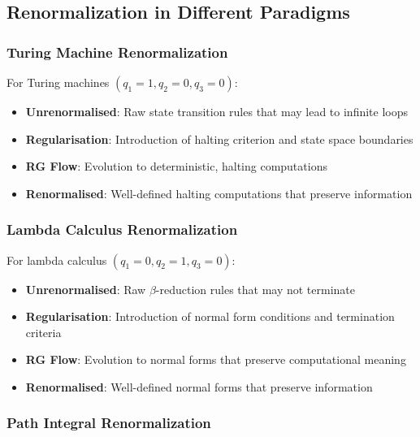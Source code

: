\subsection{Renormalization in Different Paradigms}

\subsubsection{Turing Machine Renormalization}

\begin{theorem}
\label{thm:turing-renorm}
For Turing machines $(q_1=1, q_2=0, q_3=0)$:
\begin{itemize}
\item \textbf{Unrenormalised}: Raw state transition rules that may lead to infinite loops
\item \textbf{Regularisation}: Introduction of halting criterion and state space boundaries
\item \textbf{RG Flow}: Evolution to deterministic, halting computations
\item \textbf{Renormalised}: Well-defined halting computations that preserve information
\end{itemize}
\end{theorem}

\subsubsection{Lambda Calculus Renormalization}

\begin{theorem}
\label{thm:lambda-renorm}
For lambda calculus $(q_1=0, q_2=1, q_3=0)$:
\begin{itemize}
\item \textbf{Unrenormalised}: Raw $\beta$-reduction rules that may not terminate
\item \textbf{Regularisation}: Introduction of normal form conditions and termination criteria
\item \textbf{RG Flow}: Evolution to normal forms that preserve computational meaning
\item \textbf{Renormalised}: Well-defined normal forms that preserve information
\end{itemize}
\end{theorem}

\subsubsection{Path Integral Renormalization}

